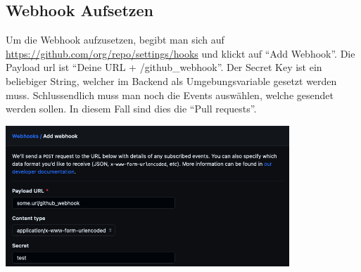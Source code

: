 \subsection{Webhook Aufsetzen}
Um die Webhook aufzusetzen, begibt man sich auf \url{https://github.com/org/repo/settings/hooks} und klickt auf
\enquote{Add Webhook}. Die Payload url ist \enquote{Deine URL + /github\_webhook}. Der Secret Key ist ein beliebiger
String, welcher im Backend als Umgebungsvariable gesetzt werden muss. Schlussendlich muss man noch die Events
auswählen, welche gesendet werden sollen. In diesem Fall sind dies die \enquote{Pull requests}.
\begin{center}
  \includegraphics[width=0.8\textwidth]{images/misc/setup_webhook.png}
  \label{fig:github_webhook}
\end{center}

